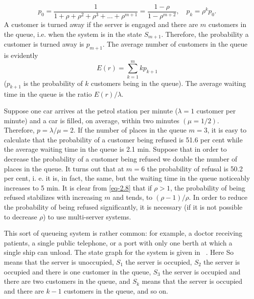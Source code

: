 \begin{equation}%
p_{0} = \frac{1}{1 + \rho+ \rho^{2}+ \rho^{3}+ \ldots + \rho^{m+1}} = \frac{1 - \rho}{1 - \rho^{m+2}}, \quad  p_{k}= \rho^{k} p_{0}.
\label{eq-2.8}
\end{equation}
A customer is turned away if the server is engaged and there are $m$ customers in the queue, i.e. when the system is in the state $S_{m+1}$. Therefore, the probability a customer is turned away is $p_{m+1}$. The average number of customers in the queue is evidently
\begin{equation*}%
E(r) = \sum_{k=1}^{m} k p_{k+1}
\end{equation*}
($p_{k+1}$ is the probability of $k$ customers being in the queue). The average
waiting time in the queue is the ratio $E (r)/\lambda$.

Suppose one car arrives at the petrol station per minute ($\lambda = 1$
customer per minute) and a car is filled, on average, within two minutes
$(\mu= 1/2)$. Therefore, $p = \lambda/\mu = 2$. If the number of places in the queue $m = 3$, it is easy to calculate that the probability of a customer being
refused is 51.6 per cent while the average waiting time in the queue is
2.1 min. Suppose that in order to decrease the probability of a customer
being refused we double the number of places in the queue. It turns out
that at $m = 6$ the probability of refusal is 50.2 per cent, i. e. it is, in fact, the same, but the waiting time in the queue noticeably increases to
5 min. It is clear from \eqref{eq-2.8} that if $\rho > 1$, the probability of being refused stabilizes with increasing $m$ and tends, to $(\rho - 1)/\rho$. In order to reduce the probability of being refused significantly, it is necessary (if it is not possible to decrease $\rho$) to use multi-server systems.

 This sort of queueing
system is rather common: for example, a doctor receiving patients,
a single public telephone, or a port with only one berth at which
a single ship can unload. The state graph for the system is given in
~. Here So means that the server is unoccupied, $S_{1}$ the server is occupied, $S_{2}$ the server is occupied and there is one customer in the queue, $S_{3}$ the server is occupied and there are two customers in the queue, and $S_{k}$ means that the server is occupied and there are $k - 1$
customers in the queue, and so on.

